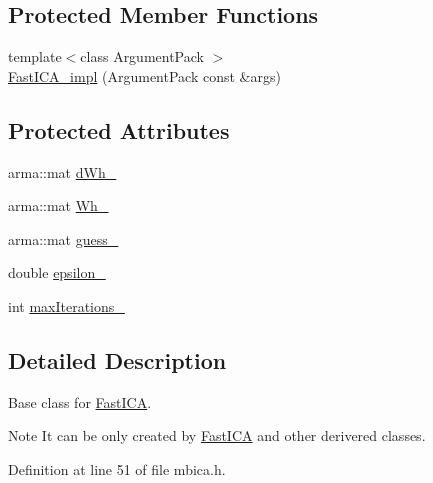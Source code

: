 \subsection*{Protected Member Functions}
\begin{DoxyCompactItemize}
\item 
{\footnotesize template$<$class ArgumentPack $>$ }\\\hyperlink{classmbica_1_1_fast_i_c_a__impl_ade2c64db507233e92c06be6f178a1287}{FastICA\_\-impl} (ArgumentPack const \&args)
\end{DoxyCompactItemize}
\subsection*{Protected Attributes}
\begin{DoxyCompactItemize}
\item 
arma::mat \hyperlink{classmbica_1_1_fast_i_c_a__impl_ab1733850788ffd4118563e443cbd12bf}{dWh\_\-}
\item 
arma::mat \hyperlink{classmbica_1_1_fast_i_c_a__impl_a11bb92ab13c2a5d86ee57368a0c6f37b}{Wh\_\-}
\item 
arma::mat \hyperlink{classmbica_1_1_fast_i_c_a__impl_a44e32ead6a78e76dadddd503732bed29}{guess\_\-}
\item 
double \hyperlink{classmbica_1_1_fast_i_c_a__impl_a286ddf4b806607c6b1ff2c01638b562f}{epsilon\_\-}
\item 
int \hyperlink{classmbica_1_1_fast_i_c_a__impl_a33dc4e8644810412d57896fbcd9aed91}{maxIterations\_\-}
\end{DoxyCompactItemize}


\subsection{Detailed Description}
Base class for \hyperlink{classmbica_1_1_fast_i_c_a}{FastICA}.

\begin{DoxyNote}{Note}
It can be only created by \hyperlink{classmbica_1_1_fast_i_c_a}{FastICA} and other derivered classes. 
\end{DoxyNote}


Definition at line 51 of file mbica.h.



